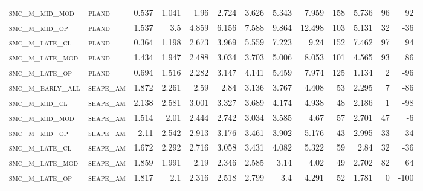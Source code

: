 \begin{landscape}
\begin{center}
\begin{footnotesize}
\begin{longtable}{llrrrrrrrr|rrr}
\textsc{smc\_m\_mid\_mod  } & \textsc{pland     }   & 0.537    & 1.041    & 1.96     & 2.724    & 3.626    & 5.343    & 7.959    & 158    & 5.736         & 96            & 92              \\
\textsc{smc\_m\_mid\_op   } & \textsc{pland     }   & 1.537    & 3.5      & 4.859    & 6.156    & 7.588    & 9.864    & 12.498   & 103    & 5.131         & 32            & -36             \\
\textsc{smc\_m\_late\_cl  } & \textsc{pland     }   & 0.364    & 1.198    & 2.673    & 3.969    & 5.559    & 7.223    & 9.24     & 152    & 7.462         & 97            & 94              \\
\textsc{smc\_m\_late\_mod } & \textsc{pland     }   & 1.434    & 1.947    & 2.488    & 3.034    & 3.703    & 5.006    & 8.053    & 101    & 4.565         & 93            & 86              \\
\textsc{smc\_m\_late\_op  } & \textsc{pland     }   & 0.694    & 1.516    & 2.282    & 3.147    & 4.141    & 5.459    & 7.974    & 125    & 1.134         & 2             & -96             \\
\textsc{smc\_m\_early\_all} & \textsc{shape\_am }   & 1.872    & 2.261    & 2.59     & 2.84     & 3.136    & 3.767    & 4.408    & 53     & 2.295         & 7             & -86             \\
\textsc{smc\_m\_mid\_cl   } & \textsc{shape\_am }   & 2.138    & 2.581    & 3.001    & 3.327    & 3.689    & 4.174    & 4.938    & 48     & 2.186         & 1             & -98             \\
\textsc{smc\_m\_mid\_mod  } & \textsc{shape\_am }   & 1.514    & 2.01     & 2.444    & 2.742    & 3.034    & 3.585    & 4.67     & 57     & 2.701         & 47            & -6              \\
\textsc{smc\_m\_mid\_op   } & \textsc{shape\_am }   & 2.11     & 2.542    & 2.913    & 3.176    & 3.461    & 3.902    & 5.176    & 43     & 2.995         & 33            & -34             \\
\textsc{smc\_m\_late\_cl  } & \textsc{shape\_am }   & 1.672    & 2.292    & 2.716    & 3.058    & 3.431    & 4.082    & 5.322    & 59     & 2.84          & 32            & -36             \\
\textsc{smc\_m\_late\_mod } & \textsc{shape\_am }   & 1.859    & 1.991    & 2.19     & 2.346    & 2.585    & 3.14     & 4.02     & 49     & 2.702         & 82            & 64              \\
\textsc{smc\_m\_late\_op  } & \textsc{shape\_am }   & 1.817    & 2.1      & 2.316    & 2.518    & 2.799    & 3.4      & 4.291    & 52     & 1.781         & 0             & -100            \\

\end{longtable}
\end{footnotesize}
\end{center}
\end{landscape}
